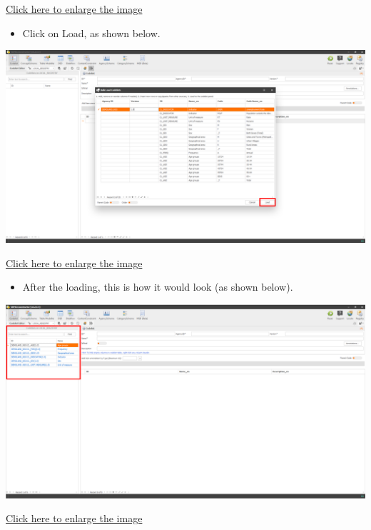 \documentclass[
]{book}
\providecommand{\tightlist}{%
  \setlength{\itemsep}{0pt}\setlength{\parskip}{0pt}}
\begin{document}
\href{images/image092.png}{Click here to enlarge the image}

\begin{itemize}
\tightlist
\item
  Click on Load, as shown below.
\end{itemize}

\begin{center}\includegraphics[width=1\linewidth]{./images/image094} \end{center}

\href{images/image094.png}{Click here to enlarge the image}

\begin{itemize}
\tightlist
\item
  After the loading, this is how it would look (as shown below).
\end{itemize}

\begin{center}\includegraphics[width=1\linewidth]{./images/image096} \end{center}

\href{images/image096.png}{Click here to enlarge the image}
\end{document}
